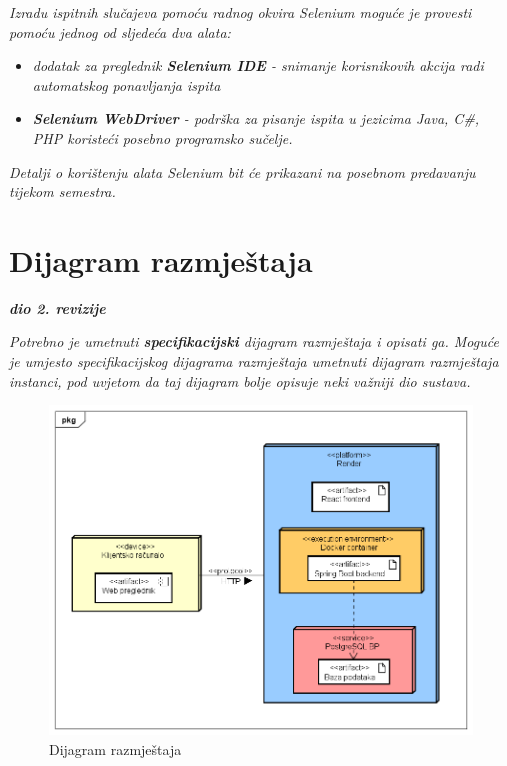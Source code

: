 			 \textit{Izradu ispitnih slučajeva pomoću radnog okvira Selenium moguće je provesti pomoću jednog od sljedeća dva alata:}
			 \begin{itemize}
			 	\item \textit{dodatak za preglednik \textbf{Selenium IDE} - snimanje korisnikovih akcija radi automatskog ponavljanja ispita	}
			 	\item \textit{\textbf{Selenium WebDriver} - podrška za pisanje ispita u jezicima Java, C\#, PHP koristeći posebno programsko sučelje.}
			 \end{itemize}
		 	\textit{Detalji o korištenju alata Selenium bit će prikazani na posebnom predavanju tijekom semestra.}
			
			\eject 
		
		
		\section{Dijagram razmještaja}
			
			\textbf{\textit{dio 2. revizije}}
			
			 \textit{Potrebno je umetnuti \textbf{specifikacijski} dijagram razmještaja i opisati ga. Moguće je umjesto specifikacijskog dijagrama razmještaja umetnuti dijagram razmještaja instanci, pod uvjetom da taj dijagram bolje opisuje neki važniji dio sustava.}
			 
			 \begin{figure}[H]
				\includegraphics[scale=0.6]{slike/dijagram_razmjestaja.PNG} 
				\centering
				\caption{Dijagram razmještaja}
				\label{dijagram_razmjestaja}
			\end{figure}
			
